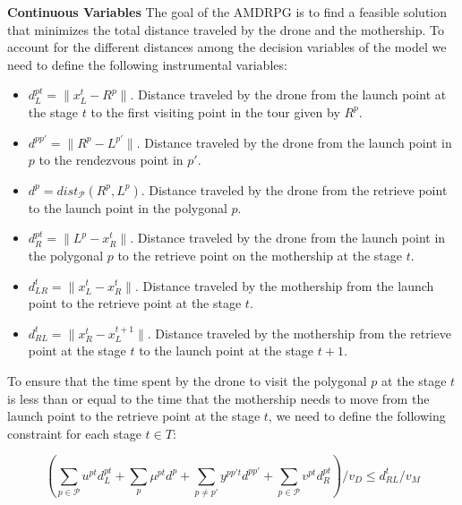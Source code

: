 \documentclass[10pt,a4paper]{article}
\def\AMD{{\sf AMDRPG \xspace }}
\newcommand{\JP}[1]{{\color{armygreen}#1}}
\begin{document}
\textbf{Continuous Variables}
The goal of the \AMD is to find a feasible solution that minimizes the total distance traveled by the drone and the mothership. To account for the different distances among the decision variables of the model we need to define the following instrumental variables:
\begin{itemize}
    \item $d_L^{pt} = \|x_L^t - R^{p}\|$. Distance traveled by the drone from the launch point at the stage $t$ to the first visiting point in the tour given by $R^p$.
    \item $d^{pp'} = \|R^{p} - L^{p'}\|$. Distance traveled by the drone from the launch point in $p$ to the rendezvous point in $p'$.
    \item $d^{p} = dist_{\mathcal P}(R^p, L^p)$. Distance traveled by the drone from the retrieve point to the launch point in  the polygonal $p$.
    \item $d_R^{pt} = \|L^{p} - x_R^t\|$. Distance traveled by the drone from the launch point in the polygonal $p$ to the retrieve point on the mothership at the stage $t$.
    \item $d_{LR}^t = \|x_L^t - x_R^t\|$. Distance traveled by the mothership from the launch point to the retrieve point at the stage $t$.
    \item $d_{RL}^t = \|x_R^t - x_L^{t+1}\|$. Distance traveled by the mothership from the retrieve point at the stage $t$ to the launch point at the stage $t+1$.
\end{itemize}

To ensure that the time spent by the drone to visit the polygonal $p$ at the stage $t$ is less than or equal to the time that the mothership needs to move from the launch point to the retrieve point at the stage $t$, we need to define the following constraint for each stage $t\in T$:

\begin{equation}\tag{DCW-t}\label{DCW-t}
\left(\sum_{p\in \mathcal P} u^{pt}d_L^{pt} + \sum_{p}\mu^{pt}d^p + \sum_{p\neq p'}y^{pp't}d^{pp'} + \sum_{p\in \mathcal P} v^{pt}d_R^{pt}\right)/v_D \leq d_{RL}^t/v_M
\end{equation}



\end{document}
